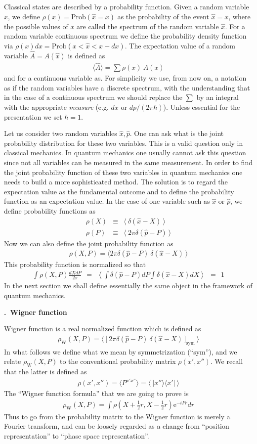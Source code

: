 \documentclass[onecolumn,fleqn, 11pt]{revtex4}
\newcommand{\eexp}{\mathrm{e}^}
\newcommand{\tbox}[1]{\text{#1}}
\newcommand{\beq}{\begin{eqnarray}}
\newcommand{\eeq}{\end{eqnarray}}
\renewcommand{\thesubsection}{\arabic{subsection}}
\renewcommand{\thesubsubsection}{\arabic{subsubsection}}
\newcommand{\sheadC}[1]
{
\addtocounter{subsubsection}{1}
\vspace{5mm}
{\bf \thesubsection.\thesubsubsection \ #1}  
\nopagebreak
\phantomsection
}
\begin{document}
Classical states are described by a probability function.
Given a random variable $\hat{x}$, we define $\rho(x) = \mathrm{Prob}(\hat{x}=x)$ 
as the probability of the event ${ \hat{x} = x }$,  
where the possible values of $x$ are called the spectrum 
of the random variable $\hat{x}$. 
For a random variable continuous spectrum we 
define the  probability density function 
via ${\rho(x)dx =\mathrm{Prob}( x < \hat{x}< x+dx)}$. 
The expectation value of a random variable $\hat{A}=A(\hat{x})$ 
is defined as  
\beq
\langle\hat{A}\rangle = \sum{ \rho(x) \ A(x) }
\eeq
and for a continuous variable as. 
For simplicity we use, from now on, a notation 
as if the random variables have a discrete spectrum, 
with the understanding that in the case of a continuous 
spectrum we should replace the $\sum$ by an integral with 
the appropriate {\em measure} (e.g. $dx$ or $dp/(2\pi\hbar)$).  
Unless essential for the presentation we set ${\hbar=1}$. 


Let us consider two random variables ${ \hat{x}, \hat{p} }$.
One can ask what is the joint probability distribution 
for these two variables.  This is a valid question only in classical
mechanics.  In quantum mechanics one usually cannot ask this question
since not all variables can be measured in the same measurement.  
In order to find the joint probability function of these two variables
in quantum mechanics one needs to build a more sophisticated method.
The solution is to regard the expectation value as the fundamental
outcome and to define the probability function as an expectation value.
In the case of one variable such as $\hat{x}$ or $\hat{p}$, we define
probability functions as
\beq
\rho(X) &\equiv& \langle \ \delta(\hat{x}-X) \ \rangle 
\\ \nonumber
\rho(P) &\equiv& \langle \ 2\pi\delta(\hat{p}-P) \ \rangle
\eeq
Now we can also define the joint probability function as
\beq
\rho(X,P) = \langle 2\pi\delta(\hat{p}-P) \ \delta(\hat{x}-X) \ \rangle
\eeq
This probability function is normalized so that
\beq
\int \rho(X,P)\frac{dX dP}{2\pi} 
\ \ = \ \ \left\langle\int{\delta(\hat{p}-P)dP}\int{\delta(\hat{x}-X)dX}\right\rangle
\ \ = \ \ 1
\eeq
In the next section we shall define essentially the same object 
in the framework of quantum mechanics.




\sheadC{Wigner function}

Wigner function is a real normalized function which is defined as
\beq
\rho_{\tbox{W}}(X,P)
=\Big\langle \ \Big[ 
\ 2\pi\delta(\hat{p}-P) \ \delta(\hat{x}-X) \ 
\Big]_{\tbox{sym}} \ \Big\rangle
\eeq
In what follows we define what we mean 
by symmetrization (``sym''), and we 
relate $\rho_{\tbox{W}}(X,P)$ to the conventional 
probability matrix $\rho(x',x'')$.  
We recall that the latter is defined as
\beq
\rho(x',x'')
=\Big\langle P^{x'x''}\Big\rangle
=\Big\langle \ |x''\rangle\langle x'| \ \Big\rangle
\eeq
The ``Wigner function formula'' that we are going to prove is 
\beq
\rho_{\tbox{W}}(X,P) = \int  \rho\left( X+\frac{1}{2}r, X-\frac{1}{2}r \right) \eexp{-iPr} dr
\eeq
Thus to go from the probability matrix to the Wigner function 
is merely a Fourier transform, and can be loosely regarded 
as a change from ``position representation'' to ``phase space representation''.     
\end{document}
